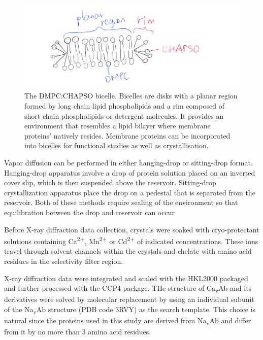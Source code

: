 \documentclass[
]{article}
\begin{document}
\begin{figure}
\includegraphics[width=1\linewidth]{../img/dmpc-chapso} \caption{The DMPC:CHAPSO bicelle. Bicelles are disks with a planar region formed by long chain lipid phospholipids and a rim composed of short chain phospholipids or detergent molecules. It provides an environment that resembles a lipid bilayer where membrane proteins' natively resides. Membrane proteins can be incorporated into bicelles for functional studies as well as crystallisation.}\label{fig:dmpc-chapso}
\end{figure}

Vapor diffusion can be performed in either hanging-drop or sitting-drop format. Hanging-drop apparatus involve a drop of protein solution placed on an inverted cover slip, which is then suspended above the reservoir. Sitting-drop crystallization apparatus place the drop on a pedestal that is separated from the reservoir. Both of these methods require sealing of the environment so that equilibration between the drop and reservoir can occur

Before X-ray diffraction data collection, crystals were soaked with cryo-protectant solutions containing Ca\textsuperscript{2+}, Mn\textsuperscript{2+} or Cd\textsuperscript{2+} of indicated concentrations. These ions travel through solvent channels within the crystals and chelate with amino acid residues in the selectivity filter region.

X-ray diffraction data were integrated and scaled with the HKL2000 packaged and further processed with the CCP4 package. THe structure of Ca\textsubscript{v}Ab and its derivatives were solved by molecular replacement by using an individual subunit of the Na\textsubscript{v}Ab structure (PDB code 3RVY) as the search template. This choice is natural since the proteins used in this study are derived from Na\textsubscript{v}Ab and differ from it by no more than 3 amino acid residues.
\end{document}
